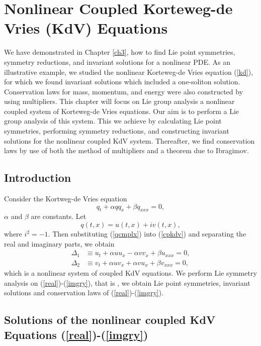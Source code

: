 \chapter{Nonlinear Coupled  Korteweg-de Vries (KdV) Equations \label{ch4}}
We have demonstrated in Chapter \ref{ch3}, how to find Lie point symmetries, symmetry reductions, and invariant solutions for a nonlinear PDE. As an illustrative example,
we studied the nonlinear Korteweg-de Vries equation (\ref{kd}), for which we found invariant solutions which included a one-soliton solution. Conservation laws for mass, momentum, and energy were also constructed by using multipliers. This chapter will focus on Lie group analysis a nonlinear coupled system of Korteweg-de Vries equations. Our aim is to perform a Lie group analysis of this system. This we achieve by calculating Lie point symmetries, performing symmetry reductions, and constructing invariant solutions for the nonlinear coupled KdV system. Thereafter,  we find conservation laws by use of both the method of multipliers and a theorem due to Ibragimov.
\section{Introduction}
Consider the Kortweg-de Vries equation  \begin{equation} q_t + \alpha q q_x + \beta q_{xxx} =0, \label{cpkdv}
\end{equation} $ \alpha$ and $ \beta$ are constants.
Let \begin{equation}
q(t,x) = u(t,x)+ i v(t,x),\label{qcmplx}
\end{equation} where $ i^2=-1$. Then substituting (\ref{qcmplx}) into (\ref{cpkdv}) and separating the real and imaginary parts, we obtain \begin{align} \label{real} \Delta_1 &\equiv u_t + \alpha u u_x - \alpha v v_x + \beta u_{xxx} =0,\\
 \label{imgry} \Delta_2 & \equiv v_t + \alpha u v_x + \alpha v u_x + \beta v_{xxx}=0,
\end{align} which is a nonlinear system of coupled KdV equations. We perform Lie symmetry analysis on (\ref{real})-(\ref{imgry}), that is , we obtain Lie point symmetries,  invariant solutions and conservation laws of (\ref{real})-(\ref{imgry}).
\section{Solutions of the nonlinear coupled KdV Equations (\ref{real})-(\ref{imgry})}
